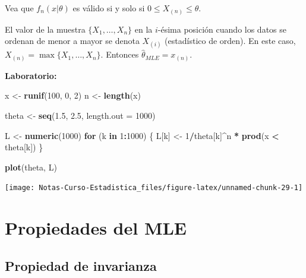 \documentclass[
  12pt,
]{book}
\newenvironment{Shaded}{\begin{snugshade}}{\end{snugshade}}
\newcommand{\ControlFlowTok}[1]{\textcolor[rgb]{0.13,0.29,0.53}{\textbf{#1}}}
\newcommand{\DataTypeTok}[1]{\textcolor[rgb]{0.13,0.29,0.53}{#1}}
\newcommand{\DecValTok}[1]{\textcolor[rgb]{0.00,0.00,0.81}{#1}}
\newcommand{\FloatTok}[1]{\textcolor[rgb]{0.00,0.00,0.81}{#1}}
\newcommand{\KeywordTok}[1]{\textcolor[rgb]{0.13,0.29,0.53}{\textbf{#1}}}
\newcommand{\NormalTok}[1]{#1}
\newcommand{\OperatorTok}[1]{\textcolor[rgb]{0.81,0.36,0.00}{\textbf{#1}}}
\newcommand{\StringTok}[1]{\textcolor[rgb]{0.31,0.60,0.02}{#1}}
\begin{document}
Vea que \(f_n(x|\theta)\) es válido si y solo si \(0\leq X_{(n)}\leq \theta\).

El valor de la muestra \(\{X_1,\dots, X_n\}\) en la \(i\)-ésima posición cuando los
datos se ordenan de menor a mayor se denota \(X_{(i)}\) (estadístico de orden). En
este caso, \(X_{(n)} = \max\{X_1,\dots, X_n\}\). Entonces \(\hat\theta_{MLE} = x_{(n)}\).

\textbf{Laboratorio:}

\begin{Shaded}
\begin{Highlighting}[]
\NormalTok{x \textless{}{-}}\StringTok{ }\KeywordTok{runif}\NormalTok{(}\DecValTok{100}\NormalTok{, }\DecValTok{0}\NormalTok{, }\DecValTok{2}\NormalTok{)}
\NormalTok{n \textless{}{-}}\StringTok{ }\KeywordTok{length}\NormalTok{(x)}

\NormalTok{theta \textless{}{-}}\StringTok{ }\KeywordTok{seq}\NormalTok{(}\FloatTok{1.5}\NormalTok{, }\FloatTok{2.5}\NormalTok{, }\DataTypeTok{length.out =} \DecValTok{1000}\NormalTok{)}

\NormalTok{L \textless{}{-}}\StringTok{ }\KeywordTok{numeric}\NormalTok{(}\DecValTok{1000}\NormalTok{)}
\ControlFlowTok{for}\NormalTok{ (k }\ControlFlowTok{in} \DecValTok{1}\OperatorTok{:}\DecValTok{1000}\NormalTok{) \{}
\NormalTok{    L[k] \textless{}{-}}\StringTok{ }\DecValTok{1}\OperatorTok{/}\NormalTok{theta[k]}\OperatorTok{\^{}}\NormalTok{n }\OperatorTok{*}\StringTok{ }\KeywordTok{prod}\NormalTok{(x }\OperatorTok{\textless{}}\StringTok{ }\NormalTok{theta[k])}
\NormalTok{\}}

\KeywordTok{plot}\NormalTok{(theta, L)}
\end{Highlighting}
\end{Shaded}

\begin{center}\texttt{[image: Notas-Curso-Estadistica\_files/figure-latex/unnamed-chunk-29-1]} \end{center}

\hypertarget{propiedades-del-mle}{%
\section{Propiedades del MLE}\label{propiedades-del-mle}}

\hypertarget{propiedad-de-invarianza}{%
\subsection{Propiedad de invarianza}\label{propiedad-de-invarianza}}
\end{document}
